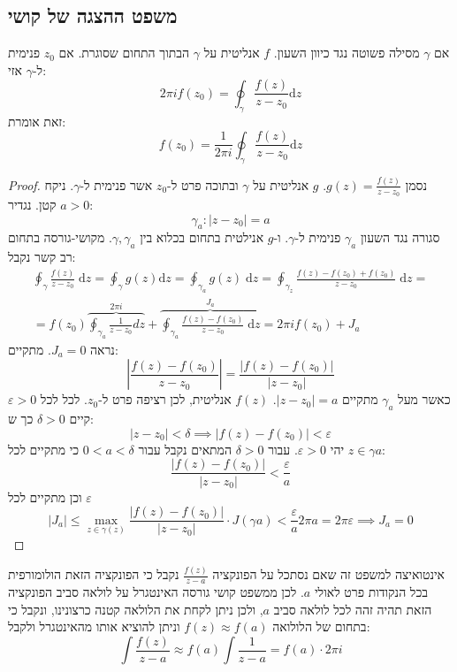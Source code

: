 \documentclass{tstextbook}
\begin{document}
\subsection{משפט ההצגה של קושי}

\begin{theorem}
אם \(\gamma\) מסילה פשוטה נגד כיוון השעון. \(f\) אנליטית על \(\gamma\) הבתוך התחום שסוגרת.
אם \(z_{0}\) פנימית ל-\(\gamma\) אזי:
$$2\pi i f(z_{0})=\oint_{\gamma} \frac{f(z)}{z-z_{0}} \mathrm{d}z$$
זאת אומרת:
$$f(z_{0})=\frac{1}{2\pi i}\oint_{\gamma} \frac{f(z)}{z-z_{0}}\mathrm{d}z$$

\end{theorem}
\begin{proof}
נסמן \(g(z)=\frac{f(z)}{z-z_{0}}\). \(g\) אנליטית על \(\gamma\) ובתוכה פרט ל-\(z_{0}\) אשר פנימית ל-\(\gamma\).
ניקח \(a>0\) קטן. נגדיר:
$$\gamma_{a}:\lvert z-z_{0} \rvert = a$$
סגורה נגד השעון \(\gamma_{a}\) פנימית ל-\(\gamma\). ו-\(g\) אנילטית בתחום בכלוא בין \(\gamma,\gamma_{a}\). מקושי-גורסה בתחום רב קשר נקבל:
$$\begin{gather}\oint_{\gamma} \frac{f(z)}{z-z_{0}}\;\mathrm{d}z=\oint_{\gamma}g(z)\mathrm{d}z=\oint_{\gamma_{a}}g(z)\;\mathrm{d}z=\oint_{\gamma_{z}} \frac{f(z)-f(z_{0})+f(z_{0})}{z-z_{0}}\;\mathrm{d}z= \\=f(z_{0})\overbrace{ \oint_{\gamma_{a}} \frac{1}{z-z_{0}}dz }^{ 2\pi i }+\overbrace{ \oint_{\gamma_{a}}\frac{f(z)-f(z_{0})}{z-z_{0}}\;\mathrm{d}z }^{ J_{a} }=2\pi if(z_{0})+J_{a} 
\end{gather}$$
נראה \(J_{a}=0\). מתקיים:
$$\left\lvert  \frac{f(z)-f(z_{0})}{z-z_{0}}  \right\rvert =\frac{\lvert f(z)-f(z_{0}) \rvert}{\lvert z-z_{0} \rvert } $$
כאשר מעל \(\gamma _a\) מתקיים \(\lvert z-z_{0} \rvert=a\). \(f(z)\) אנליטית, לכן רציפה פרט ל-\(z_{0}\). לכל לכל \(\varepsilon>0\) קיים \(\delta > 0\) כך ש:
$$\lvert z-z_{0} \rvert <\delta \implies \lvert f(z)-f(z_{0}) \rvert <\varepsilon$$
יהי \(\varepsilon>0\). עבור \(\delta>0\) המתאים נקבל עבור \(0<a<\delta\) כי מתקיים לכל \(z \in \gamma a\):
$$\frac{\lvert f(z)-f(z_{0}) \rvert }{\lvert z-z_{0} \rvert }<\frac{\varepsilon}{a}$$
וכן מתקיים לכל \(\varepsilon\)$$\lvert J_{a} \rvert \leq \max _{z \in \gamma(z)}\frac{\lvert f(z)-f(z_{0}) \rvert }{\lvert z-z_{0} \rvert }\cdot J\left( \gamma a \right) < \frac{\varepsilon}{a} 2 \pi a = 2 \pi \varepsilon\implies J_{a} = 0$$

\end{proof}
אינטואיצה למשפט זה שאם נסתכל על הפונקציה \(\frac{f(z)}{z-a}\) נקבל כי הפונקציה הזאת הולומורפית בכל הנקודות פרט לאולי \(a\). לכן ממשפט קושי גורסה האינטגרל על לולאה סביב הפונקציה הזאת תהיה זהה לכל לולאה סביב \(a\), ולכן ניתן לקחת את הלולאה קטנה כרצונינו, ונקבל כי בתחום של הלולואה \(f(z)\approx f(a)\) וניתן להוציא אותו מהאינטגרל ולקבל:
$$\int \frac{f(z)}{z-a}\approx f(a) \int \frac{1}{z-a}=f(a) \cdot 2\pi i$$
\end{document}
